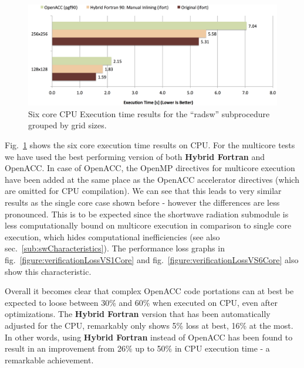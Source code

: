 \begin{figure}[htpb]
        \centering
        \includegraphics[width=14cm]{figures/verificationCPU6CoreExecTime}
        \caption[Six Core CPU Execution Time Results of Sample Implementation]{Six core CPU Execution time results for the ``radsw'' subprocedure grouped by grid sizes.}
        \label{figure:verificationCPU6CoreExecTime}
\end{figure}

Fig.~\ref{figure:verificationCPU6CoreExecTime} shows the six core execution time results on CPU. For the multicore tests we have used the best performing version of both \textbf{Hybrid Fortran} and OpenACC. In case of OpenACC, the OpenMP directives for multicore execution have been added at the same place as the OpenACC accelerator directives (which are omitted for CPU compilation). We can see that this leads to very similar results as the single core case shown before - however the differences are less pronounced. This is to be expected since the shortwave radiation submodule is less computationally bound on multicore execution in comparison to single core execution, which hides computational inefficiencies (see also sec.~\ref{sub:swCharacteristics}). The performance loss graphs in fig.~\ref{figure:verificationLossVS1Core} and fig.~\ref{figure:verificationLossVS6Core} also show this characteristic. 

Overall it becomes clear that complex OpenACC code portations can at best be expected to loose between 30\% and 60\% when executed on CPU, even after optimizations. The \textbf{Hybrid Fortran} version that has been automatically adjusted for the CPU, remarkably only shows 5\% loss at best, 16\% at the most. In other words, using \textbf{Hybrid Fortran} instead of OpenACC has been found to result in an improvement from 26\% up to 50\% in CPU execution time - a remarkable achievement.

